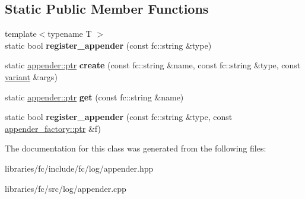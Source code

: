 \subsection*{Static Public Member Functions}
\begin{DoxyCompactItemize}
\item 
\mbox{\label{classfc_1_1appender_a17851a47296d3c9d02947dba7d2bf924}} 
{\footnotesize template$<$typename T $>$ }\\static bool {\bfseries register\+\_\+appender} (const fc\+::string \&type)
\item 
\mbox{\label{classfc_1_1appender_a7d474a3ade4d0a88c25c1b8dfd16fbc9}} 
static \mbox{\hyperlink{classfc_1_1shared__ptr}{appender\+::ptr}} {\bfseries create} (const fc\+::string \&name, const fc\+::string \&type, const \mbox{\hyperlink{classfc_1_1variant}{variant}} \&args)
\item 
\mbox{\label{classfc_1_1appender_a346c3cde73e77dcfc101f28983d7c0f9}} 
static \mbox{\hyperlink{classfc_1_1shared__ptr}{appender\+::ptr}} {\bfseries get} (const fc\+::string \&name)
\item 
\mbox{\label{classfc_1_1appender_a012af8b950f47f2fb1e89e70f1e60388}} 
static bool {\bfseries register\+\_\+appender} (const fc\+::string \&type, const \mbox{\hyperlink{classfc_1_1shared__ptr}{appender\+\_\+factory\+::ptr}} \&f)
\end{DoxyCompactItemize}


The documentation for this class was generated from the following files\+:\begin{DoxyCompactItemize}
\item 
libraries/fc/include/fc/log/appender.\+hpp\item 
libraries/fc/src/log/appender.\+cpp\end{DoxyCompactItemize}

